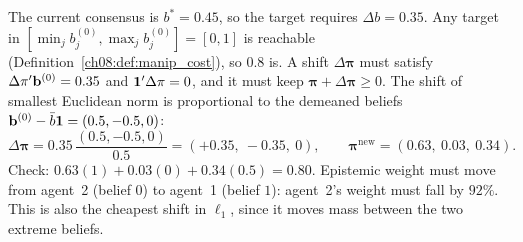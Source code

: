 \documentclass[../solutions_manual.tex]{subfiles}
\begin{document}

 The current consensus is $b^* = 0.45$, so the target requires $\Delta b = 0.35$. Any target in $[\min_j b_j^{(0)}, \max_j b_j^{(0)}] = [0, 1]$ is reachable (Definition~\ref{ch08:def:manip_cost}), so $0.8$ is. A shift $\Delta\boldsymbol{\pi}$ must satisfy $\Delta\pi'\mathbf{b}^{(0)} = 0.35$ and $\mathbf{1}'\Delta\pi = 0$, and it must keep $\boldsymbol{\pi} + \Delta\boldsymbol{\pi} \ge 0$. The shift of smallest Euclidean norm is proportional to the demeaned beliefs $\mathbf{b}^{(0)} - \bar b\mathbf{1} = (0.5, -0.5, 0)$:
\[
\Delta\boldsymbol{\pi} = 0.35\,\frac{(0.5, -0.5, 0)}{0.5} = (+0.35,\ -0.35,\ 0), \qquad \boldsymbol{\pi}^{\text{new}} = (0.63,\ 0.03,\ 0.34).
\]
Check: $0.63(1) + 0.03(0) + 0.34(0.5) = 0.80$. Epistemic weight must move from agent~2 (belief $0$) to agent~1 (belief $1$): agent~2's weight must fall by $92\%$. This is also the cheapest shift in $\ell_1$, since it moves mass between the two extreme beliefs.
\end{document}
